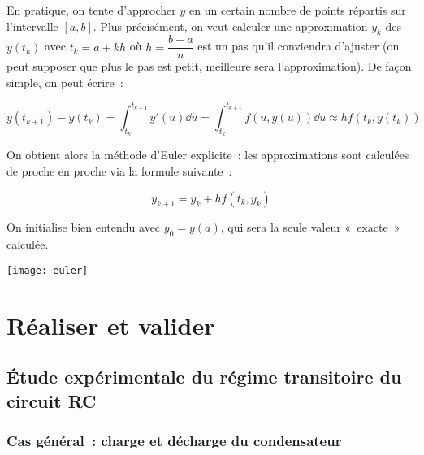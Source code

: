 \documentclass[../main/main.tex]{subfiles}
\begin{document}
En pratique, on tente d'approcher $y$ en un certain nombre de points répartis
sur l'intervalle $[a,b]$. Plus précisément, on veut calculer une approximation
$y_k$ des $y(t_k)$ avec $t_k=a+kh$ où $h=\dfrac{b-a}{n}$ est un pas qu'il
conviendra d'ajuster (on peut supposer que plus le pas est petit, meilleure sera
l'approximation). De façon simple, on peut écrire~:

\[y(t_{k+1})-y(t_k) =
	\int_{t_k}^{t_{k+1}}y'(u) \dd u =
	\int_{t_k}^{t_{k+1}} f(u,y(u)) \dd u \approx
	h f(t_k,y(t_k))\]

On obtient alors la méthode d'Euler explicite~: les approximations sont
calculées de proche en proche via la formule suivante~:

$$y_{k+1}=y_k+hf(t_k,y_k)$$

On initialise bien entendu avec $y_0=y(a)$, qui sera la seule valeur «~exacte~»
calculée.

\begin{center}
	\texttt{[image: euler]}
\end{center}

\section{Réaliser et valider}

\subsection{Étude expérimentale du régime transitoire du circuit RC}

\subsubsection{Cas général~: charge et décharge du condensateur}
\end{document}

